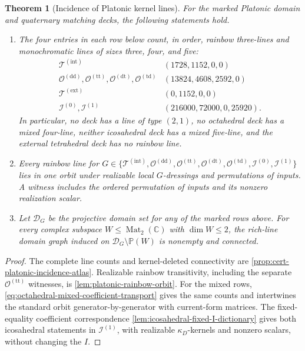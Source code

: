 \documentclass[11pt,letterpaper,onecolumn]{article}
\theoremstyle{plain}
\newtheorem{theorem}{Theorem}[section]
\theoremstyle{definition}
\theoremstyle{remark}
\newcommand{\TetInt}{{\mathcal T^{(\mathrm{int})}}}
\newcommand{\TetExt}{{\mathcal T^{(\mathrm{ext})}}}
\newcommand{\OctDD}{{\mathcal O^{(\mathrm{dd})}}}
\newcommand{\OctTT}{{\mathcal O^{(\mathrm{tt})}}}
\newcommand{\OctDT}{{\mathcal O^{(\mathrm{dt})}}}
\newcommand{\OctTD}{{\mathcal O^{(\mathrm{td})}}}
\newcommand{\IcoZero}{{\mathcal I^{(0)}}}
\newcommand{\IcoOne}{{\mathcal I^{(1)}}}
\newcommand{\Mat}{\operatorname{Mat}}
\begin{document}
\begin{theorem}[Incidence of Platonic kernel lines]
\label{thm:cert-interface-platonic-incidence}
For the marked Platonic domain and quaternary matching decks, the following
statements hold.
\begin{enumerate}[label=\textnormal{(\roman*)}]
\item The four entries in each row below count, in order, rainbow
      three-lines and monochromatic lines of sizes three, four, and five:
      \[
      \begin{array}{c|c}
      \TetInt&(1728,1152,0,0)\\
      \OctDD,\OctTT,\OctDT,\OctTD
        &(13824,4608,2592,0)\\
      \TetExt&(0,1152,0,0)\\
      \IcoZero,\IcoOne&(216000,72000,0,25920).
      \end{array}
      \]
      In particular, no deck has a line of type \((2,1)\), no
      octahedral deck has a mixed four-line, neither icosahedral deck has a
      mixed five-line, and the external tetrahedral deck has no rainbow
      line.
\item Every rainbow line for
      \(G\in\{\TetInt,\OctDD,\OctTT,\OctDT,
      \OctTD,\IcoZero,\IcoOne\}\)
      lies in one orbit under realizable local \(G\)-dressings and permutations of inputs.  A witness includes the ordered permutation of inputs and
      its nonzero realization scalar.
\item Let \(\mathcal D_G\) be the projective domain set for any of the
      marked rows above.  For every complex subspace
      \(W\le\Mat_2(\mathbb C)\) with \(\dim W\le2\), the rich-line domain
      graph induced on \(\mathcal D_G\setminus\mathbb P(W)\) is nonempty and
      connected.
\end{enumerate}
\end{theorem}

\begin{proof}
The complete line counts and kernel-deleted connectivity are
\cref{prop:cert-platonic-incidence-atlas}. Realizable rainbow transitivity,
including the separate \(\OctTT\) witnesses, is
\cref{lem:platonic-rainbow-orbit}.  For the mixed rows,
\cref{eq:octahedral-mixed-coefficient-transport} gives the same counts and
intertwines the standard orbit generator-by-generator with current-form matrices.  The fixed-equality coefficient correspondence
\cref{lem:icosahedral-fixed-I-dictionary} gives both icosahedral statements
in \(\IcoOne\), with realizable \(\kappa_D\)-kernels and nonzero scalars,
without changing the \(I\).
\end{proof}
\end{document}
